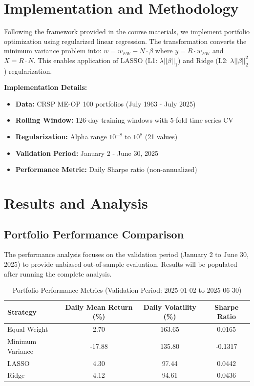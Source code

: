 \documentclass[12pt]{article}
\begin{document}
\section{Implementation and Methodology}

Following the framework provided in the course materials, we implement portfolio optimization using regularized linear regression. The transformation converts the minimum variance problem into: $w = w_{EW} - N \cdot \beta$ where $y = R \cdot w_{EW}$ and $X = R \cdot N$. This enables application of LASSO (L1: $\lambda ||\beta||_1$) and Ridge (L2: $\lambda ||\beta||_2^2$) regularization.

\textbf{Implementation Details:}
\begin{itemize}
    \item \textbf{Data:} CRSP ME-OP 100 portfolios (July 1963 - July 2025)
    \item \textbf{Rolling Window:} 126-day training windows with 5-fold time series CV
    \item \textbf{Regularization:} Alpha range $10^{-8}$ to $10^{8}$ (21 values)
    \item \textbf{Validation Period:} January 2 - June 30, 2025
    \item \textbf{Performance Metric:} Daily Sharpe ratio (non-annualized)
\end{itemize}

\section{Results and Analysis}

\subsection{Portfolio Performance Comparison}
The performance analysis focuses on the validation period (January 2 to June 30, 2025) to provide unbiased out-of-sample evaluation. Results will be populated after running the complete analysis.

\begin{table}[H]
\centering
\caption{Portfolio Performance Metrics (Validation Period: 2025-01-02 to 2025-06-30)}
\label{tab:performance}
\begin{tabular}{lccc}
\toprule
Strategy & Daily Mean Return (\%) & Daily Volatility (\%) & Sharpe Ratio \\
\midrule
Equal Weight & 2.70 & 163.65 & 0.0165 \\
Minimum Variance & -17.88 & 135.80 & -0.1317 \\
LASSO & 4.30 & 97.44 & 0.0442 \\
Ridge & 4.12 & 94.61 & 0.0436 \\
\bottomrule
\end{tabular}
\end{table}
\end{document}
